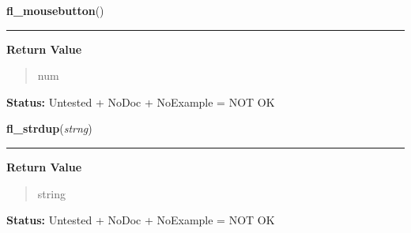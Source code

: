     \label{xformslib:library:fl_mouse_button}

    \vspace{0.5ex}

\hspace{.8\funcindent}\begin{boxedminipage}{\funcwidth}

    \raggedright \textbf{fl\_mousebutton}()

    \vspace{-1.5ex}

    \rule{\textwidth}{0.5\fboxrule}
\setlength{\parskip}{2ex}
\setlength{\parskip}{1ex}
      \textbf{Return Value}
    \vspace{-1ex}

      \begin{quote}
      num

      \end{quote}

\textbf{Status:} Untested + NoDoc + NoExample = NOT OK



    \end{boxedminipage}

    \label{xformslib:library:fl_strdup}

    \vspace{0.5ex}

\hspace{.8\funcindent}\begin{boxedminipage}{\funcwidth}

    \raggedright \textbf{fl\_strdup}(\textit{strng})

    \vspace{-1.5ex}

    \rule{\textwidth}{0.5\fboxrule}
\setlength{\parskip}{2ex}
\setlength{\parskip}{1ex}
      \textbf{Return Value}
    \vspace{-1ex}

      \begin{quote}
      string

      \end{quote}

\textbf{Status:} Untested + NoDoc + NoExample = NOT OK



    \end{boxedminipage}

